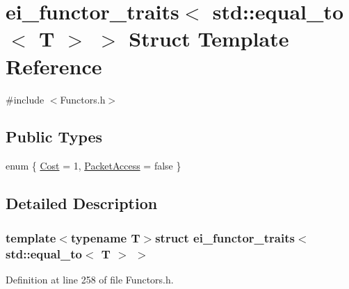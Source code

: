 \hypertarget{structei__functor__traits_3_01std_1_1equal__to_3_01_t_01_4_01_4}{\section{ei\-\_\-functor\-\_\-traits$<$ std\-:\-:equal\-\_\-to$<$ T $>$ $>$ Struct Template Reference}
\label{structei__functor__traits_3_01std_1_1equal__to_3_01_t_01_4_01_4}
}


{\ttfamily \#include $<$Functors.\-h$>$}

\subsection*{Public Types}
\begin{DoxyCompactItemize}
\item 
enum \{ \hyperlink{structei__functor__traits_3_01std_1_1equal__to_3_01_t_01_4_01_4_a8868971d1773aecd44f28a08668a77d7a997c505a10cb509ffa9017dc870d5379}{Cost} = 1, 
\hyperlink{structei__functor__traits_3_01std_1_1equal__to_3_01_t_01_4_01_4_a8868971d1773aecd44f28a08668a77d7a787986a34b5eb51aece1e245dace1a27}{Packet\-Access} = false
 \}
\end{DoxyCompactItemize}


\subsection{Detailed Description}
\subsubsection*{template$<$typename T$>$struct ei\-\_\-functor\-\_\-traits$<$ std\-::equal\-\_\-to$<$ T $>$ $>$}



Definition at line 258 of file Functors.\-h.



